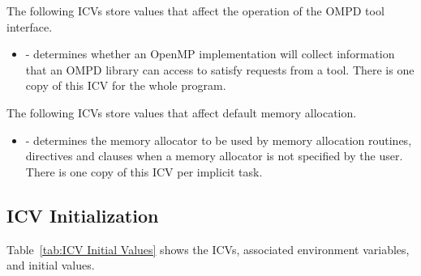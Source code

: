 The following ICVs store values that affect the operation of the
OMPD tool interface.

\begin{itemize}
\item
   - determines whether an OpenMP implementation will collect
  information that an OMPD library can access to satisfy requests from
  a tool.
  There is one copy of this ICV for the whole program.
\end{itemize}

The following ICVs store values that affect default memory allocation.

\begin{itemize}

\item {} - determines the memory allocator to be used by memory allocation routines, directives and clauses when a memory allocator is not specified by the user. There is one copy of this ICV per implicit task.

\end{itemize}




\subsection{ICV Initialization}
\label{subsec:ICV Initialization}
Table~\ref{tab:ICV Initial Values} shows the ICVs, associated
environment variables, and initial values.

